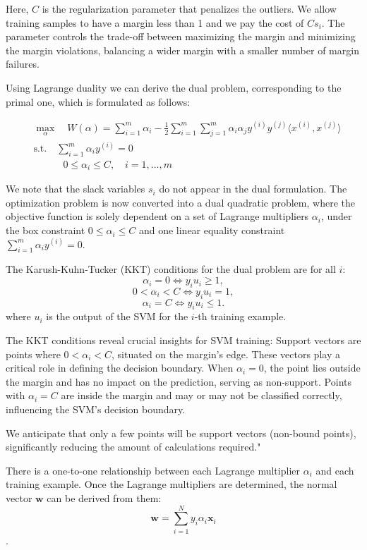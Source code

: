 \documentclass[10pt,a4paper]{article}
\newcounter{para}
\begin{document}
Here, \( C \) is the regularization parameter that penalizes the outliers. We allow training samples to have a margin less than 1 and we pay the cost of \( C s_i\). The parameter controls the trade-off between maximizing the margin and minimizing the margin violations, balancing a wider margin with a smaller number of margin failures.

Using Lagrange duality we can derive the dual problem, corresponding to the primal one, which is formulated as follows:

\[
\begin{aligned}
	& \max_{\alpha} \quad W(\alpha) = \sum_{i=1}^{m} \alpha_i - \frac{1}{2} \sum_{i=1}^{m} \sum_{j=1}^{m} \alpha_i \alpha_j y^{(i)} y^{(j)} \langle x^{(i)}, x^{(j)} \rangle \\
	& \text{s.t.} \quad \sum_{i=1}^{m} \alpha_i y^{(i)} = 0 \\
	& \quad \quad \quad 0 \leq \alpha_i \leq C, \quad i = 1, \ldots, m
\end{aligned}
\]

We note that the slack variables \(s_i\) do not appear in the dual formulation.
The optimization problem is now converted into a dual quadratic problem, where the objective function is solely dependent on a set of Lagrange multipliers \(\alpha_i\), under the box constraint \(0 \leq \alpha_i \leq C\) and one linear equality constraint \(\sum_{i=1}^{m} \alpha_i y^{(i)} = 0\). 


The Karush-Kuhn-Tucker (KKT) conditions for the dual problem are for all \( i \):
\[ 
\alpha_i = 0 \iff y_i u_i \geq 1,
\]
\[ 
0 < \alpha_i < C \iff y_i u_i = 1,
\]
\[ 
\alpha_i = C \iff y_i u_i \leq 1.
\]
where \( u_i \) is the output of the SVM for the \( i \)-th training example.

The KKT conditions reveal crucial insights for SVM training:
Support vectors are points where \( 0 < \alpha_i < C \), situated on the margin's edge. These vectors play a critical role in defining the decision boundary.
When \( \alpha_i = 0 \), the point lies outside the margin and has no impact on the prediction, serving as non-support.
Points with \( \alpha_i = C \) are inside the margin and may or may not be classified correctly, influencing the SVM's decision boundary.

We anticipate that only a few points will be support vectors (non-bound points), significantly reducing the amount of calculations required."

There is a one-to-one relationship between each Lagrange multiplier \( \alpha_i \) and each training example. Once the Lagrange multipliers are determined, the normal vector \( \mathbf{w} \) can be derived from them:
\[ 
\mathbf{w} = \sum_{i=1}^{N} y_i \alpha_i \mathbf{x}_i 
\].
\end{document}
